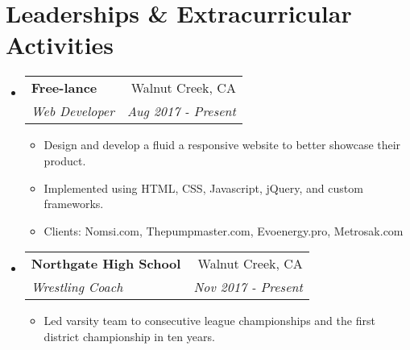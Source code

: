 \documentclass[letterpaper,11pt]{article}
\makeatletter
\newcommand{\resumeSubheading}[4]{
  \vspace{-1pt}\item
    \begin{tabular*}{0.97\textwidth}{l@{\extracolsep{\fill}}r}
      \textbf{#1} & #2 \\
      \textit{\small#3} & \textit{\small #4} \\
    \end{tabular*}\vspace{-5pt}
}
\newcommand{\resumeSubHeadingListStart}{\begin{itemize}[leftmargin=*]}
\newcommand{\resumeSubHeadingListEnd}{\end{itemize}}
\makeatother
\begin{document}
\section{Leaderships \& Extracurricular Activities}
\resumeSubHeadingListStart
	\resumeSubheading
	{Free-lance}{Walnut Creek, CA}
	{Web Developer}{Aug 2017 - Present}
	\begin{itemize}
		\item {Design and develop a fluid a responsive website to better showcase their product.}  
		\item {Implemented using HTML, CSS, Javascript, jQuery, and custom frameworks.}  
		\item {Clients: Nomsi.com, Thepumpmaster.com, Evoenergy.pro, Metrosak.com}  
	\end{itemize}
	\resumeSubheading
	{Northgate High School}{Walnut Creek, CA}
	{Wrestling Coach}{Nov 2017 - Present}
	\begin{itemize}
		\item {Led varsity team to consecutive league championships and the first district championship in ten years.}
	\end{itemize}
\resumeSubHeadingListEnd
   


	
\end{document}
